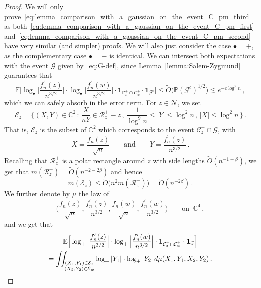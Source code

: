 \documentclass[10pt,a4paper]{amsart}
\newcommand{\bC}{\mathbb C}
\newcommand{\bE}{\mathbb E}
\newcommand{\bP}{\mathbb P}
\newcommand{\cC}{\mathcal C}
\newcommand{\cE}{\mathcal{E}}
\newcommand{\cG}{\mathcal G}
\newcommand{\cN}{\mathcal N}
\newcommand{\cR}{\mathcal R}
\newcommand{\one}{\boldsymbol{1}}
\begin{document}
    \begin{proof}
        We will only prove~\eqref{eq:lemma_comparison_with_a_gaussian_on_the_event_C_pm_third} as both~\eqref{eq:lemma_comparison_with_a_gaussian_on_the_event_C_pm_first} and~\eqref{eq:lemma_comparison_with_a_gaussian_on_the_event_C_pm_second} have very similar (and simpler) proofs. We will also just consider the case $\bullet = +$, as the complementary case $\bullet = -$ is identical. We can intersect both expectations with the event $\cG$ given by~\eqref{eq:G-def}, since Lemma~\ref{lemma:Salem-Zygmund} guarantees that
        \[
        \bE\Big[ \log_\bullet \Big|\frac{f_n^\prime(z)}{n^{3/2}}\Big| \cdot \log_\bullet \Big|\frac{f_n^\prime(w)}{n^{3/2}}\Big| \cdot \one_{\cC_z^+\cap \cC_w^{+}} \cdot \one_{\cG^c} \Big] \le \widetilde{O}\big(\bP(\cG^c)^{1/2}\big) \lesssim e^{-c\log^2 n} \, ,
        \]
        which we can safely absorb in the error term. For $z\in \cN$, we set 
        \begin{equation}
        \label{eq:def_of_E_z}
            \mathcal{E}_z = \Big\{ (X,Y) \in \bC^2 \, : \,  \frac{X}{nY} \in \cR_z^+ -z \, , \, \frac1{\log^9 n} \le |Y| \le \log^2 n \, , \, |X|\le \log^2 n \, \Big\} \, .
        \end{equation}
        That is, $\cE_z$ is the subset of $\bC^2$ which corresponds to the event $\cC_z^+\cap\cG$, with 
        \[
        X = \frac{f_n(z)}{\sqrt{n}} \qquad \text{and} \qquad Y = \frac{f_n^\prime(z)}{n^{3/2}} \, .
        \]
        Recalling that $\cR_z^+$ is a polar rectangle around $z$ with side lengths $\widetilde{O}(n^{-1-\beta})$, we get that $m(\cR_z^+) = \widetilde{O}(n^{-2-2\beta})$ and hence
        \begin{equation}
            \label{eq:bound_on_measure_of_E_z}
            m(\cE_z) \le \widetilde{O}\big(n^2 m(\cR_z^+) \big) = \widetilde{O}(n^{-2\beta}) \, .
        \end{equation}We further denote by $\mu$ the law of
        \[
        \Big(\frac{f_n(z)}{\sqrt{n}},\frac{f_n^\prime(z)}{n^{3/2}},\frac{f_n(w)}{\sqrt{n}},\frac{f_n^\prime(w)}{n^{3/2}}\Big) \qquad \text{on } \ \bC^4\, ,
        \]
        and we get that 
        \begin{multline}
        \label{eq:expectaion_of_logs_in_complex_coordinates}
            \bE\Big[ \log_+ \Big|\frac{f_n^\prime(z)}{n^{3/2}}\Big| \cdot \log_+ \Big|\frac{f_n^\prime(w)}{n^{3/2}}\Big| \cdot \one_{\cC_z^+\cap \cC_w^{+}} \cdot \one_{\cG} \Big] \\  = \iint_{\substack{  (X_1,Y_1)\in \cE_z \\  (X_2,Y_2)\in \cE_w }} \log_+|Y_1| \cdot \log_+|Y_2| \, {\rm d}\mu(X_1,Y_1,X_2,Y_2) \, .

\end{multline}
\end{proof}
\end{document}
